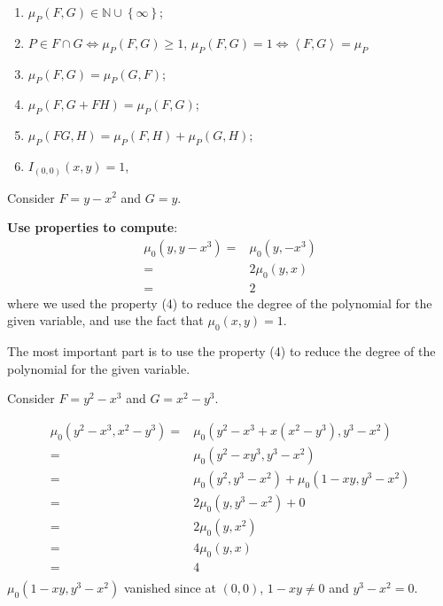\documentclass[10pt]{article}
\begin{document}
\begin{proposition}
  \begin{enumerate}[(1)]
    \item $ \mu_{P}(F,G) \in \mathbb{N} \cup \left\{ \infty  \right\}$;
    \item $ P \in F \cap G \Leftrightarrow \mu_{P}(F,G) \ge 1$, $ \mu_{P}(F,G) = 1 \Leftrightarrow \left< F,G \right> = \mu_{P}$
    \item $ \mu_{P}(F,G) = \mu_{P}(G,F)$;
    \item $ \mu_{P}(F, G+FH) = \mu_{P}(F,G)$;
    \item $ \mu_{P}(FG, H) = \mu_{P}(F,H) + \mu_{P}(G,H);$
    \item $ I_{(0,0)}(x,y) = 1$,
  \end{enumerate}
\end{proposition}

\begin{example}
  Consider $ F = y - x^{2}$ and $ G = y$.
\end{example}
\begin{solution}
  \textbf{Use properties to compute}:
  \begin{equation*}
    \begin{aligned}
      \mu_{0}(y, y - x^{3}) = & \mu_{0}(y , - x^3) \\
      = & 2 \mu_{0} (y,x) \\
      = & 2
    \end{aligned}
  \end{equation*}
  where we used the property (4) to reduce the degree of the polynomial for the given variable, and use the fact that $ \mu_{0}(x,y) = 1$.
\end{solution}
The most important part is to use the property (4) to reduce the degree of the polynomial for the given variable.
\begin{example}
  Consider $ F = y^{2} - x^{3}$ and $ G = x^{2} - y^{3}$.
\end{example}
\begin{solution}
  \begin{equation*}
    \begin{aligned}
      \mu_{0}(y^{2} - x^{3}, x^{2} - y^{3}) = & \mu_{0}(y^{2} - x^{3} + x (x^{2} - y^{3}), y^{3} - x^{2}) \\
      = & \mu_{0}(y^{2} - x y^{3}, y^{3} - x^{2}) \\
      = & \mu_{0}(y^{2}, y^{3} - x^{2}) + \mu_{0}(1 - x y, y^{3} - x^{2}) \\
      = & 2 \mu_{0}(y, y^{3} - x^{2}) + 0\\
      = & 2 \mu_{0}(y, x^{2})\\
      = & 4 \mu_{0}(y,x) \\
      = & 4\\
    \end{aligned}
  \end{equation*}
  $ \mu_{0}(1-xy, y^{3} - x^{2})$ vanished since at $ (0,0)$, $ 1 - xy \neq 0$ and $ y^{3} - x^{2} = 0$.
\end{solution}
\end{document}
